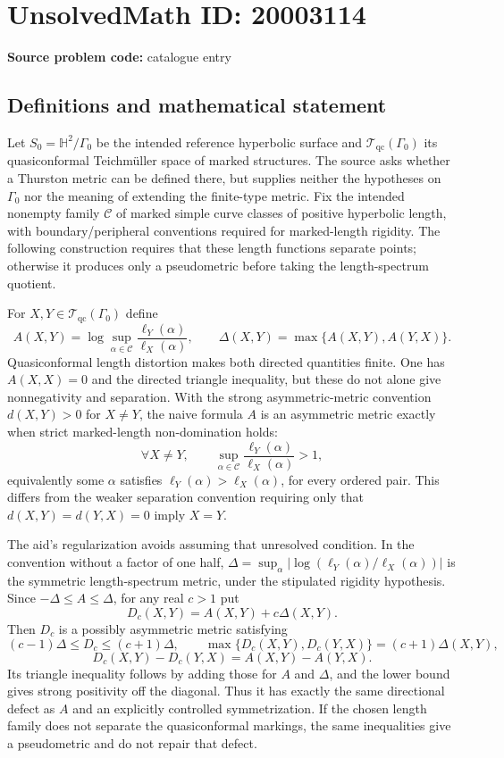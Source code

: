 \documentclass[11pt]{article}
\begin{document}
\section*{UnsolvedMath ID: 20003114}
\textbf{Source problem code:} catalogue entry
\subsection{Definitions and mathematical statement}
Let $S_0=\mathbb H^2/\Gamma_0$ be the intended reference hyperbolic surface and $\mathcal T_{\mathrm{qc}}(\Gamma_0)$ its quasiconformal Teichm\"uller space of marked structures. The source asks whether a Thurston metric can be defined there, but supplies neither the hypotheses on $\Gamma_0$ nor the meaning of extending the finite-type metric. Fix the intended nonempty family $\mathcal C$ of marked simple curve classes of positive hyperbolic length, with boundary/peripheral conventions required for marked-length rigidity. The following construction requires that these length functions separate points; otherwise it produces only a pseudometric before taking the length-spectrum quotient.

For $X,Y\in\mathcal T_{\mathrm{qc}}(\Gamma_0)$ define
\[
A(X,Y)=\log\sup_{\alpha\in\mathcal C}\frac{\ell_Y(\alpha)}{\ell_X(\alpha)},\qquad
\Delta(X,Y)=\max\{A(X,Y),A(Y,X)\}.
\]
Quasiconformal length distortion makes both directed quantities finite. One has $A(X,X)=0$ and the directed triangle inequality, but these do not alone give nonnegativity and separation. With the strong asymmetric-metric convention $d(X,Y)>0$ for $X\ne Y$, the naive formula $A$ is an asymmetric metric exactly when strict marked-length non-domination holds:
\[
\forall X\ne Y,\qquad
\sup_{\alpha\in\mathcal C}\frac{\ell_Y(\alpha)}{\ell_X(\alpha)}>1,
\]
equivalently some $\alpha$ satisfies $\ell_Y(\alpha)>\ell_X(\alpha)$, for every ordered pair. This differs from the weaker separation convention requiring only that $d(X,Y)=d(Y,X)=0$ imply $X=Y$.

The aid's regularization avoids assuming that unresolved condition. In the convention without a factor of one half, $\Delta=\sup_\alpha|\log(\ell_Y(\alpha)/\ell_X(\alpha))|$ is the symmetric length-spectrum metric, under the stipulated rigidity hypothesis. Since $-\Delta\leq A\leq\Delta$, for any real $c>1$ put
\[
D_c(X,Y)=A(X,Y)+c\Delta(X,Y).
\]
Then $D_c$ is a possibly asymmetric metric satisfying
\[
(c-1)\Delta\leq D_c\leq(c+1)\Delta,
\qquad\max\{D_c(X,Y),D_c(Y,X)\}=(c+1)\Delta(X,Y),
\]
\[
D_c(X,Y)-D_c(Y,X)=A(X,Y)-A(Y,X).
\]
Its triangle inequality follows by adding those for $A$ and $\Delta$, and the lower bound gives strong positivity off the diagonal. Thus it has exactly the same directional defect as $A$ and an explicitly controlled symmetrization. If the chosen length family does not separate the quasiconformal markings, the same inequalities give a pseudometric and do not repair that defect.
\end{document}
